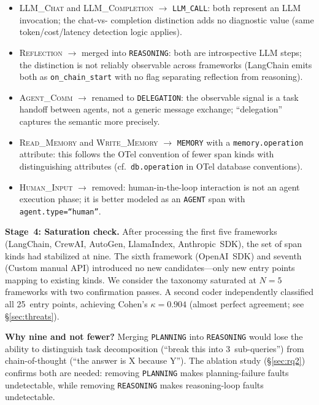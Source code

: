 \documentclass[sigplan,10pt,screen]{acmart}
\begin{document}
\begin{itemize}[leftmargin=*,nosep]
\item \textsc{LLM\_Chat} and \textsc{LLM\_Completion} $\to$
  \texttt{LLM\_CALL}: both represent an LLM invocation; the chat-vs-%
  completion distinction adds no diagnostic value (same token/cost/latency
  detection logic applies).
\item \textsc{Reflection} $\to$ merged into \texttt{REASONING}: both
  are introspective LLM steps; the distinction is not reliably
  observable across frameworks (LangChain emits both as
  \texttt{on\_chain\_start} with no flag separating reflection from
  reasoning).
\item \textsc{Agent\_Comm} $\to$ renamed to \texttt{DELEGATION}: the
  observable signal is a task handoff between agents, not a generic
  message exchange; ``delegation'' captures the semantic more precisely.
\item \textsc{Read\_Memory} and \textsc{Write\_Memory} $\to$
  \texttt{MEMORY} with a \texttt{memory.operation} attribute: this
  follows the OTel convention of fewer span kinds with distinguishing
  attributes (cf.\ \texttt{db.operation} in OTel database conventions).
\item \textsc{Human\_Input} $\to$ removed: human-in-the-loop
  interaction is not an agent execution phase; it is better modeled as
  an \texttt{AGENT} span with \texttt{agent.type=``human''}.
\end{itemize}

\textbf{Stage~4: Saturation check.}  After processing the first five
frameworks (LangChain, CrewAI, AutoGen, LlamaIndex, Anthropic~SDK), the
set of span kinds had stabilized at nine.  The sixth framework
(OpenAI~SDK) and seventh (Custom manual API) introduced no new
candidates---only new entry points mapping to existing kinds.  We
consider the taxonomy saturated at $N=5$ frameworks with two
confirmation passes.  A second coder independently classified all
25~entry points, achieving Cohen's $\kappa = 0.904$ (almost perfect
agreement; see \S\ref{sec:threats}).

\textbf{Why nine and not fewer?}  Merging \texttt{PLANNING} into
\texttt{REASONING} would lose the ability to distinguish task
decomposition (``break this into 3~sub-queries'') from chain-of-thought
(``the answer is X because Y'').  The ablation study
(\S\ref{sec:rq2}) confirms both are needed: removing \texttt{PLANNING}
makes planning-failure faults undetectable, while removing
\texttt{REASONING} makes reasoning-loop faults undetectable.
\end{document}
